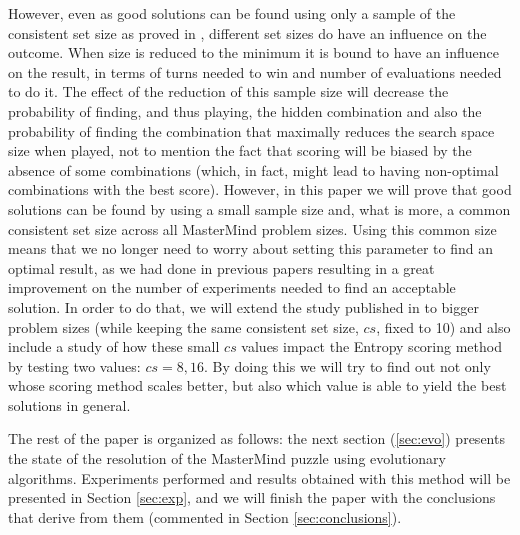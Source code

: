 \documentclass[conference]{IEEEtran}
\begin{document}
However, even as  good solutions can be found using only a sample of
the consistent set size as proved in \cite{Berghman20091880,nicso},
different set sizes do have an influence on the outcome. When 
size is reduced to the minimum it is bound to have an influence on the result, in
terms of turns needed to win and number of evaluations needed to do
it. 
The effect of the reduction of this sample size will decrease
the probability of finding, and thus playing, the hidden combination
and also the probability of finding the combination that maximally
reduces the search space size when played, not to mention the fact
that scoring will be biased by the absence of some combinations
(which, in fact, might lead to having non-optimal combinations with
the best score). 
However, in this paper we will prove that good solutions can be found
by using a small sample size and, what is more, a common consistent set size across all MasterMind 
problem sizes. Using this common size means that we no longer need to worry
about  setting this parameter to find an optimal result, as we had
done in previous papers \cite{DBLP:conf/cec/GuervosMC11} resulting in
a great improvement on the number of experiments needed to find an
acceptable solution.  
%
In order to do that, we will extend the study published in
\cite{merelo12:gameon} to bigger problem sizes (while keeping the same
consistent set size, $cs$, fixed to 10) and also include a study of
how these small $cs$ values impact the Entropy scoring method by
testing two values: $cs=8,16$. By doing this we will try to find out
not only whose scoring method scales better, but also which value is
able to yield the best solutions in general. 

The rest of the paper is organized as follows: the next section
(\ref{sec:evo}) 
presents the state of the resolution of the MasterMind puzzle using
evolutionary algorithms. Experiments performed and results obtained with this method
 will be presented in Section \ref{sec:exp}, and we will finish the paper
with the conclusions that derive from them (commented in Section
\ref{sec:conclusions}). 
\end{document}
